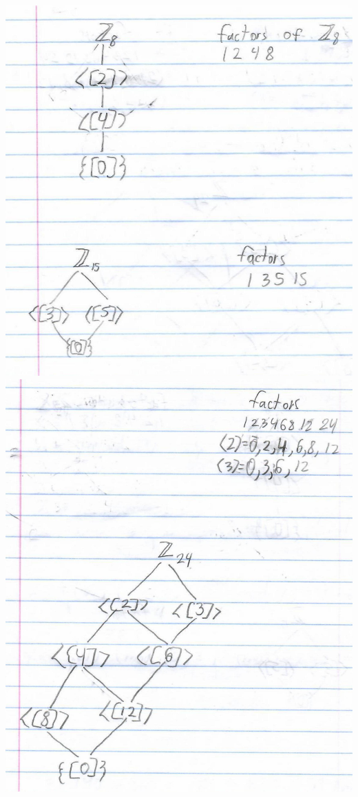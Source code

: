 \documentclass[a4paper]{article}
\begin{document}
\begin{myparindent}{0pt}
\includegraphics{lattice-Z8-Z15}
\includegraphics{lattice-Z24}

\end{myparindent}
\end{document}
